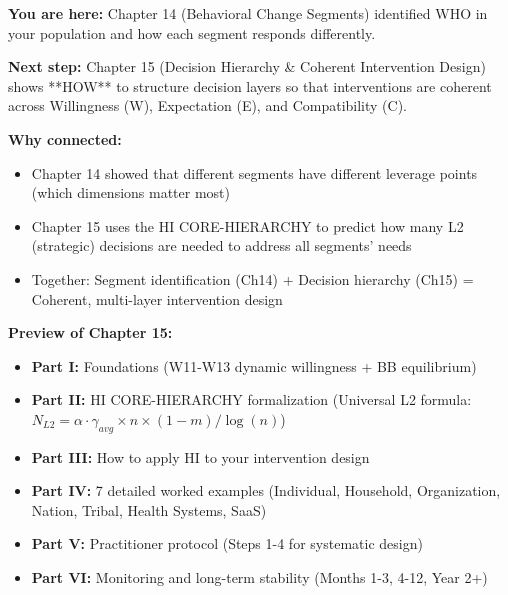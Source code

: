 \begin{tcolorbox}[colback=blue!5!white, colframe=blue!75!black, title=Reading Path: To Chapter 15 (HI CORE-HIERARCHY)]

\textbf{You are here:} Chapter 14 (Behavioral Change Segments) identified WHO in your population and how each segment responds differently.

\textbf{Next step:} Chapter 15 (Decision Hierarchy \& Coherent Intervention Design) shows **HOW** to structure decision layers so that interventions are coherent across Willingness (W), Expectation (E), and Compatibility (C).

\textbf{Why connected:}
\begin{itemize}[nosep]
    \item Chapter 14 showed that different segments have different leverage points (which dimensions matter most)
    \item Chapter 15 uses the HI CORE-HIERARCHY to predict how many L2 (strategic) decisions are needed to address all segments' needs
    \item Together: Segment identification (Ch14) + Decision hierarchy (Ch15) = Coherent, multi-layer intervention design
\end{itemize}

\textbf{Preview of Chapter 15:}
\begin{itemize}[nosep]
    \item \textbf{Part I:} Foundations (W11-W13 dynamic willingness + BB equilibrium)
    \item \textbf{Part II:} HI CORE-HIERARCHY formalization (Universal L2 formula: $N_{L2} = \alpha \cdot \gamma_{avg} \times n \times (1-m) / \log(n)$)
    \item \textbf{Part III:} How to apply HI to your intervention design
    \item \textbf{Part IV:} 7 detailed worked examples (Individual, Household, Organization, Nation, Tribal, Health Systems, SaaS)
    \item \textbf{Part V:} Practitioner protocol (Steps 1-4 for systematic design)
    \item \textbf{Part VI:} Monitoring and long-term stability (Months 1-3, 4-12, Year 2+)
\end{itemize}

\end{tcolorbox}

